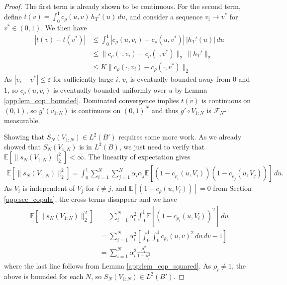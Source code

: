 \documentclass[11pt,a4paper]{article}
\newcommand{\E}{\mathbb{E}}
\begin{document}
\begin{appendices}
\begin{proof}
    The first term is already shown to be continuous. For the second term, define $t(v) = \int_0^1 c_\rho(u,v)\, h_T'(u)\, du$, and consider a sequence $v_i \to v^*$ for $v^* \in (0,1)$. We then have
    \begin{align*}
        |t(v) - t(v^*)| &\leq \int_0^1 |c_\rho(u,v_i)-c_\rho(u,v^*)|\, |h_T'(u)|\, du\\
        &\leq \|c_\rho(\cdot,v_i)-c_\rho(\cdot,v^*)\|_2 \, \|h_T'\|_2\\
        &\leq K\|c_\rho(\cdot,v_i)-c_\rho(\cdot,v^*)\|_2
    \end{align*}
    As $|v_i - v^*| \leq  \varepsilon$ for sufficiently large $i$, $v_i$ is eventually bounded away from 0 and 1, so $c_\rho(u,v_i)$ is eventually bounded uniformly over $u$ by {Lemma \ref{app:lem_cop_bounded}}. Dominated convergence implies $t(v)$ is continuous on $(0,1)$, so $g'(v_{1:N})$ is continuous on $(0,1)^N$ and thus  $g'\circ V_{1:N}$ is $\mathcal{F}_N$-measurable.
    
 Showing that $S_N(V_{1:N}) \in L^2(B')$ requires some more work. As we already showed that $S_N(V_{1:N})$ is in $L^2(B)$, we just need to verify that $\E\left[\|s_N(V_{1:N})\|^2_2\right] < \infty$.
The linearity of expectation gives
\begin{align*}
    \E\left[\|s_N(V_{1:N})\|^2_2\right] = \int_0^1 \sum_{i = 1}^N \sum_{j = 1}^N \alpha_i \alpha_j \E\left[(1-c_{\rho_i}(u,V_i))(1-c_{\rho_j}(u,V_j))\right]\, du.
\end{align*}
As $V_i$ is independent of $V_j$ for $i \neq j$, and $\E[(1-c_{\rho}(u,V_i))] = 0$ from Section \ref{app:sec_copula}, the cross-terms disappear and we have
     \begin{align*}
    \E\left[\|s_N(V_{1:N})\|^2_2\right] &=  \sum_{i = 1}^N \alpha_i^2 \int_0^1\E\left[(1-c_{\rho_i}(u,V_i))^2\right]\, du\\
    &=  \sum_{i = 1}^N \alpha_i^2 \left[\int_0^1 \int_0^1 c_{\rho_i}(u,v)^2\, du \, dv - 1\right]\\
    &=  \sum_{i = 1}^N \alpha_i^2 \frac{\rho_i^2}{1-\rho_i^2}
\end{align*}
where the last line follows from {Lemma \ref{app:lem_cop_squared}}. As $\rho_i \neq 1$, the above is bounded for each $N$, so $S_N(V_{1:N}) \in L^2(B')$.


\end{proof}
\end{appendices}
\end{document}

